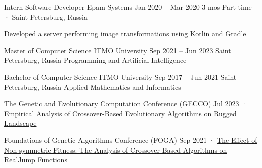 \documentclass[11pt, a4paper]{style}
\begin{document}
\begin{paracol}{2}
    \cvEntry
        {Intern Software Developer} {Epam Systems}
        {Jan 2020 -- Mar 2020} {3 mos}
        {Part-time · Saint Petersburg, Russia}
        {
            \begin{cvItems}
                \item Developed a server performing image transformations using \underline{Kotlin} and \underline{Gradle}
            \end{cvItems}
        }



    \cvEntry
        {Master of Computer Science} {ITMO University}
        {Sep 2021 -- Jun 2023} {}
        {Saint Petersburg, Russia}
        {
            \vspace{-1mm}
            Programming and Artificial Intelligence
        }

    \cvEntry
        {Bachelor of Computer Science} {ITMO University}
        {Sep 2017 -- Jun 2021} {}
        {Saint Petersburg, Russia}
        {
            \vspace{-1mm}
            Applied Mathematics and Informatics
        }



    \cvEntry
        {The Genetic and Evolutionary Computation Conference (GECCO)} {} {} {} {}
        {
            \vspace{1.5mm}
            Jul 2023 · \href{https://dl.acm.org/doi/10.1145/3583133.3596328}{Empirical Analysis of Crossover-Based Evolutionary Algorithms on Rugged Landscape}
        }

    \cvEntry
        {Foundations of Genetic Algorithms Conference (FOGA)} {} {} {} {}
        {
            \vspace{1.5mm}
            Sep 2021 · \href{https://dl.acm.org/doi/10.1145/3450218.3477311}{The Effect of Non-symmetric Fitness: The Analysis of Crossover-Based Algorithms on RealJump Functions}
        }


\switchcolumn



    \vspace{-1mm}



\end{paracol}
\end{document}
